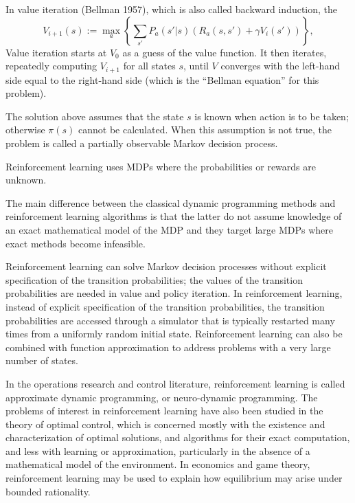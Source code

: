 In value iteration (Bellman 1957), which is also called backward induction, the 
\begin{equation}
{\displaystyle V_{i+1}(s):=\max _{a}\left\{\sum _{s'}P_{a}(s'|s)\left(R_{a}(s,s')+\gamma V_{i}(s')\right)\right\},}
\end{equation}
Value iteration starts at 
$V_{0}$ as a guess of the value function. It then iterates, repeatedly computing 
$V_{i+1}$ for all states $s$, until $V$ converges with the left-hand side equal to the right-hand side (which is the ``Bellman equation'' for this problem).


The solution above assumes that the state 
$s$ is known when action is to be taken; otherwise 
$\pi(s)$ cannot be calculated. When this assumption is not true, the problem is called a partially observable Markov decision process.%

\bigskip



Reinforcement learning uses MDPs where the probabilities or rewards are unknown.


The main difference between the classical dynamic programming methods and reinforcement learning algorithms is that the latter do not assume knowledge of an exact mathematical model of the MDP and they target large MDPs where exact methods become infeasible.

Reinforcement learning can solve Markov decision processes without explicit specification of the transition probabilities; the values of the transition probabilities are needed in value and policy iteration. In reinforcement learning, instead of explicit specification of the transition probabilities, the transition probabilities are accessed through a simulator that is typically restarted many times from a uniformly random initial state. Reinforcement learning can also be combined with function approximation to address problems with a very large number of states.

In the operations research and control literature, reinforcement learning is called approximate dynamic programming, or neuro-dynamic programming. The problems of interest in reinforcement learning have also been studied in the theory of optimal control, which is concerned mostly with the existence and characterization of optimal solutions, and algorithms for their exact computation, and less with learning or approximation, particularly in the absence of a mathematical model of the environment. In economics and game theory, reinforcement learning may be used to explain how equilibrium may arise under bounded rationality.

